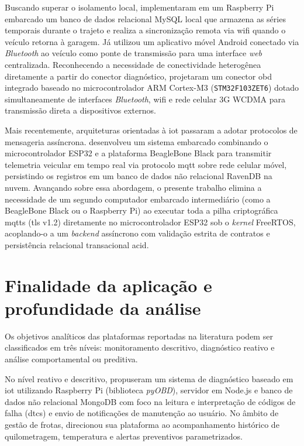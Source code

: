 \documentclass[
	12pt,				%
	openright,			%
	twoside,			%
	a4paper,			%
	english,			%
	brazil				%
	]{abntex2}
\begin{document}
Buscando superar o isolamento local,  implementaram em um
Raspberry Pi embarcado um banco de dados relacional MySQL local que armazena as séries
temporais durante o trajeto e realiza a sincronização remota via \acrshort{wifi} quando
o veículo retorna à garagem. Já  utilizou um aplicativo móvel
Android conectado via \textit{Bluetooth} ao veículo como ponte de transmissão para uma
interface \textit{web} centralizada. Reconhecendo a necessidade de conectividade
heterogênea diretamente a partir do conector diagnóstico, 
projetaram um conector \acrshort{obd} integrado baseado no microcontrolador ARM
Cortex-M3 (\texttt{STM32F103ZET6}) dotado simultaneamente de interfaces
\textit{Bluetooth}, \acrshort{wifi} e rede celular 3G WCDMA para transmissão direta a
dispositivos externos.

Mais recentemente, arquiteturas orientadas à \acrshort{iot} passaram a adotar protocolos
de mensageria assíncrona.  desenvolveu um sistema embarcado
combinando o microcontrolador ESP32 e a plataforma BeagleBone Black para transmitir
telemetria veicular em tempo real via protocolo \acrshort{mqtt} sobre rede celular
móvel, persistindo os registros em um banco de dados não relacional RavenDB na nuvem.
Avançando sobre essa abordagem, o presente trabalho elimina a necessidade de um segundo
computador embarcado intermediário (como a BeagleBone Black ou o Raspberry Pi) ao
executar toda a pilha criptográfica \acrshort{mqtts} (\acrshort{tls} v1.2) diretamente
no microcontrolador ESP32 sob o \textit{kernel} FreeRTOS, acoplando-o a um
\textit{backend} assíncrono com validação estrita de contratos e persistência relacional
transacional \acrshort{acid}.

\section{Finalidade da aplicação e profundidade da análise}

Os objetivos analíticos das plataformas reportadas na literatura podem ser classificados
em três níveis: monitoramento descritivo, diagnóstico reativo e análise comportamental
ou preditiva.

No nível reativo e descritivo,  propuseram um sistema de
diagnóstico baseado em \acrshort{iot} utilizando Raspberry Pi (biblioteca
\textit{pyOBD}), servidor em Node.js e banco de dados não relacional MongoDB com foco na
leitura e interpretação de códigos de falha (\acrshort{dtc}s) e envio de notificações de
manutenção ao usuário. No âmbito de gestão de frotas, 
direcionou sua plataforma ao acompanhamento histórico de quilometragem, temperatura e
alertas preventivos parametrizados.
\end{document}
